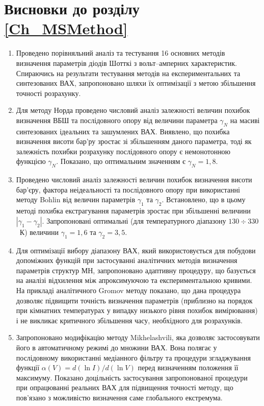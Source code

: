 \section*{Висновки до розділу \ref{Ch_MSMethod}}
  \begin{enumerate}[leftmargin=0cm,itemindent=3em]
     \item Проведено порівняльний аналіз та тестування 16 основних методів визначення параметрів діодів Шотткі з вольт--амперних характеристик.
         Спираючись на результати тестування методів на експериментальних та синтезованих  ВАХ,
         запропоновано шляхи їх оптимізації з метою збільшення точності розрахунку.

     \item Для методу Норда проведено числовий аналіз залежності величин похибок визначення ВБШ та послідовного опору від величини параметра $\gamma_N$ на масиві синтезованих ідеальних та зашумлених ВАХ.
     Виявлено, що похибка визначення висоти бар'ру зростає зі збільшенням даного параметра, тоді як залежність похибки розрахунку послідовного опору є немонотонною функцією $\gamma_N$.
     Показано, що оптимальним значенням є $\gamma_N=1,8$.


     \item Проведено числовий аналіз залежності величин похибок визначення висоти бар'єру, фактора неідеальності та послідовного опору при використанні методу Bohlin від величин параметрів $\gamma_1$ та $\gamma_2$.
     Встановлено, що в цьому методі похибка екстрагування параметрів зростає при збільшенні величини $|\gamma_1-\gamma_2|$.
     Запропоновані оптимальні (для температурного діапазону $130\div330$~К) величини $\gamma_1=1,6$ та $\gamma_2=3,5$.



     \item Для оптимізації вибору діапазону ВАХ, який використовується для побудови допоміжних функцій при застосуванні аналітичних методів визначення параметрів структур МН, запропоновано адаптивну процедуру, що базується на аналізі відхилення між апроксимуючою та експериментальною кривими.
         На прикладі аналітичного Gromov методу показано, що дана процедура дозволяє підвищити точність визначення параметрів (приблизно на порядок при кімнатних температурах у випадку низького рівня похибок вимірювання) і не викликає критичного збільшення часу, необхідного для розрахунків.

     \item Запропоновано модифікацію методу Mikhelashvili, яка дозволяє застосовувати його в автоматичному режимі до множини ВАХ.
     Вона полягає у послідовному використанні медіанного фільтру та процедури згладжування функції $\alpha(V)=d(\ln I)/d(\ln V)$ перед визначенням положення її максимуму.
     Показано доцільність застосування запропонованої процедури при опрацюванні реальних ВАХ для підвищення точності методу, що пов'язано з можливістю визначення саме глобального екстремума.


\end{enumerate}
